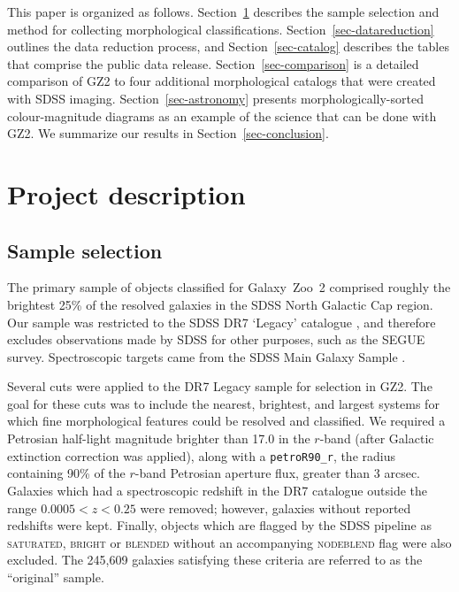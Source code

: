 \documentclass[useAMS,usenatbib]{mn2e}
\begin{document}
This paper is organized as follows. Section~\ref{sec-description} describes the sample selection and method for collecting morphological classifications. Section~\ref{sec-datareduction} outlines the data reduction process, and Section~\ref{sec-catalog} describes the tables that comprise the public data release. Section~\ref{sec-comparison} is a detailed comparison of GZ2 to four additional morphological catalogs that were created with SDSS imaging. Section~\ref{sec-astronomy} presents morphologically-sorted colour-magnitude diagrams as an example of the science that can be done with GZ2. We summarize our results in Section~\ref{sec-conclusion}. 



\section{Project description} \label{sec-description}

\subsection{Sample selection} \label{ssec-sample}
The primary sample of objects classified for Galaxy~Zoo~2 comprised roughly the brightest 25\% of the resolved galaxies in the SDSS North Galactic Cap region. Our sample was restricted to the SDSS DR7 `Legacy' catalogue \citep{aba09}, and therefore excludes observations made by SDSS for other purposes, such as the SEGUE survey. Spectroscopic targets came from the SDSS Main Galaxy Sample \citep{str02}.

Several cuts were applied to the DR7 Legacy sample for selection in GZ2. The goal for these cuts was to include the nearest, brightest, and largest systems for which fine morphological features could be resolved and classified. We required a Petrosian half-light magnitude brighter than 17.0 in the $r$-band (after Galactic extinction correction was applied), along with a {\tt petroR90\_r}, the radius containing 90\% of the $r$-band Petrosian aperture flux, greater than 3 arcsec. Galaxies which had a spectroscopic redshift in the DR7 catalogue outside the range $0.0005<z<0.25$ were removed; however, galaxies without reported redshifts were kept. Finally, objects which are flagged by the SDSS pipeline as \textsc{saturated}, \textsc{bright} or \textsc{blended} without an accompanying \textsc{nodeblend} flag were also excluded. The 245,609 galaxies satisfying these criteria are referred to as the ``original'' sample.  
\end{document}
